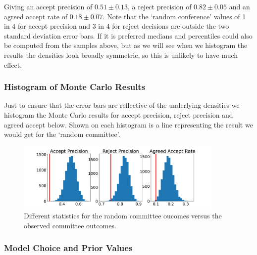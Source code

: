 Giving an accept precision of \(0.51 \pm 0.13\), a reject precision of
\(0.82 \pm 0.05\) and an agreed accept rate of \(0.18 \pm 0.07\). Note
that the `random conference' values of 1 in 4 for accept precision and 3
in 4 for reject decisions are outside the two standard deviation error
bars. If it is preferred medians and percentiles could also be computed
from the samples above, but as we will see when we histogram the results
the densities look broadly symmetric, so this is unlikely to have much
effect.

\hypertarget{histogram-of-monte-carlo-results}{%
\subsubsection{Histogram of Monte Carlo
Results}\label{histogram-of-monte-carlo-results}}

Just to ensure that the error bars are reflective of the underlying
densities we histogram the Monte Carlo results for accept precision,
reject precision and agreed accept below. Shown on each histogram is a
line representing the result we would get for the `random committee'.

\begin{figure}[htb]
\includegraphics[width=0.90\textwidth]{diagrams/neurips/random-committee-outcomes-vs-true.pdf}


\caption{Different statistics for the random committee oucomes versus the observed committee outcomes.}
\label{random-committee-outcomes}
\end{figure}

\hypertarget{model-choice-and-prior-values}{%
\subsubsection{Model Choice and Prior
Values}\label{model-choice-and-prior-values}}

